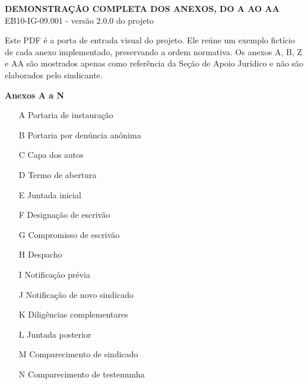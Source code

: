 \documentclass[permitir-placeholders]{sindicancia}
\begin{document}
\thispagestyle{empty}
\cabecalhoInstitucional
\vspace{1.5em}
\begin{center}
  {\Large\textbf{DEMONSTRAÇÃO COMPLETA DOS ANEXOS, DO A AO AA}}\\[0.5em]
  {\large EB10-IG-09.001 - versão 2.0.0 do projeto}
\end{center}
\vspace{1em}

Este PDF é a porta de entrada visual do projeto. Ele reúne um exemplo fictício de
cada anexo implementado, preservando a ordem normativa. Os anexos A, B, Z e AA
são mostrados apenas como referência da Seção de Apoio Jurídico e não são
elaborados pelo sindicante.

\vspace{1em}
\noindent
\begin{minipage}[t]{0.48\textwidth}
\textbf{Anexos A a N}
\begin{itemize}
  \item[A] Portaria de instauração
  \item[B] Portaria por denúncia anônima
  \item[C] Capa dos autos
  \item[D] Termo de abertura
  \item[E] Juntada inicial
  \item[F] Designação de escrivão
  \item[G] Compromisso de escrivão
  \item[H] Despacho
  \item[I] Notificação prévia
  \item[J] Notificação de novo sindicado
  \item[K] Diligências complementares
  \item[L] Juntada posterior
  \item[M] Comparecimento de sindicado
  \item[N] Comparecimento de testemunha
\end{itemize}
\end{minipage}\hfill
\end{document}
